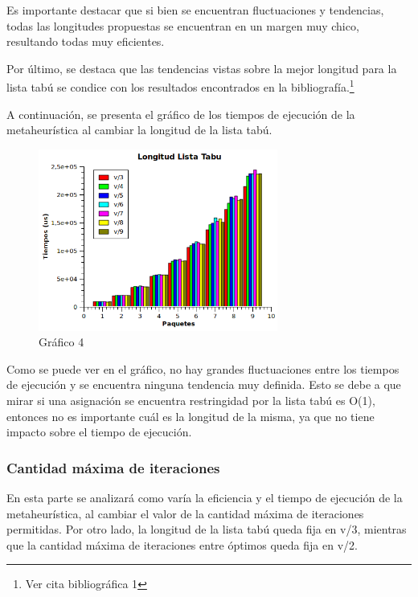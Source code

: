 \documentclass[a4paper,10pt]{article}
\begin{document}
Es importante destacar que si bien se encuentran fluctuaciones y tendencias, todas las longitudes propuestas se encuentran en un margen muy chico, resultando todas muy eficientes.

Por \'ultimo, se destaca que las tendencias vistas sobre la mejor longitud para la lista tab\'u se condice con los resultados encontrados en la bibliograf\'ia.\footnote{Ver cita bibliogr\'afica 1}

\bigskip

A continuaci\'on, se presenta el gr\'afico de los tiempos de ejecuci\'on de la metaheur\'istica al cambiar la longitud de la lista tab\'u.

\begin{figure}[H]
\centering
\includegraphics[width=0.7\textwidth]{graficos/combo3Tiempos.png} 
\caption{Gráfico 4}
\end{figure}



Como se puede ver en el gr\'afico, no hay grandes fluctuaciones entre los tiempos de ejecuci\'on y se encuentra ninguna tendencia muy definida. Esto se debe a que mirar si una asignaci\'on se encuentra restringidad por la lista tab\'u es O(1), entonces no es importante cu\'al es la longitud de la misma, ya que no tiene impacto sobre el tiempo de ejecuci\'on.

\subsubsection*{Cantidad m\'axima de iteraciones}

En esta parte se analizar\'a como var\'ia la eficiencia y el tiempo de ejecuci\'on de la metaheur\'istica, al cambiar el valor de la cantidad m\'axima de iteraciones permitidas. Por otro lado, la longitud de la lista tab\'u queda fija en v/3, mientras que la cantidad m\'axima de iteraciones entre \'optimos queda fija en v/2.
\end{document}
